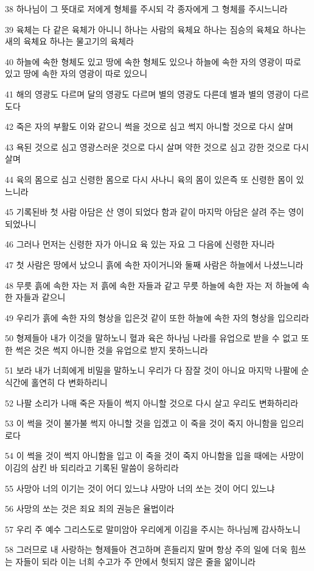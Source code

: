 \par 38 하나님이 그 뜻대로 저에게 형체를 주시되 각 종자에게 그 형체를 주시느니라
\par 39 육체는 다 같은 육체가 아니니 하나는 사람의 육체요 하나는 짐승의 육체요 하나는 새의 육체요 하나는 물고기의 육체라
\par 40 하늘에 속한 형체도 있고 땅에 속한 형체도 있으나 하늘에 속한 자의 영광이 따로 있고 땅에 속한 자의 영광이 따로 있으니
\par 41 해의 영광도 다르며 달의 영광도 다르며 별의 영광도 다른데 별과 별의 영광이 다르도다
\par 42 죽은 자의 부활도 이와 같으니 썩을 것으로 심고 썩지 아니할 것으로 다시 살며
\par 43 욕된 것으로 심고 영광스러운 것으로 다시 살며 약한 것으로 심고 강한 것으로 다시 살며
\par 44 육의 몸으로 심고 신령한 몸으로 다시 사나니 육의 몸이 있은즉 또 신령한 몸이 있느니라
\par 45 기록된바 첫 사람 아담은 산 영이 되었다 함과 같이 마지막 아담은 살려 주는 영이 되었나니
\par 46 그러나 먼저는 신령한 자가 아니요 육 있는 자요 그 다음에 신령한 자니라
\par 47 첫 사람은 땅에서 났으니 흙에 속한 자이거니와 둘째 사람은 하늘에서 나셨느니라
\par 48 무릇 흙에 속한 자는 저 흙에 속한 자들과 같고 무릇 하늘에 속한 자는 저 하늘에 속한 자들과 같으니
\par 49 우리가 흙에 속한 자의 형상을 입은것 같이 또한 하늘에 속한 자의 형상을 입으리라
\par 50 형제들아 내가 이것을 말하노니 혈과 육은 하나님 나라를 유업으로 받을 수 없고 또한 썩은 것은 썩지 아니한 것을 유업으로 받지 못하느니라
\par 51 보라 내가 너희에게 비밀을 말하노니 우리가 다 잠잘 것이 아니요 마지막 나팔에 순식간에 홀연히 다 변화하리니
\par 52 나팔 소리가 나매 죽은 자들이 썩지 아니할 것으로 다시 살고 우리도 변화하리라
\par 53 이 썩을 것이 불가불 썩지 아니할 것을 입겠고 이 죽을 것이 죽지 아니함을 입으리로다
\par 54 이 썩을 것이 썩지 아니함을 입고 이 죽을 것이 죽지 아니함을 입을 때에는 사망이 이김의 삼킨 바 되리라고 기록된 말씀이 응하리라
\par 55 사망아 너의 이기는 것이 어디 있느냐 사망아 너의 쏘는 것이 어디 있느냐
\par 56 사망의 쏘는 것은 죄요 죄의 권능은 율법이라
\par 57 우리 주 예수 그리스도로 말미암아 우리에게 이김을 주시는 하나님께 감사하노니
\par 58 그러므로 내 사랑하는 형제들아 견고하며 흔들리지 말며 항상 주의 일에 더욱 힘쓰는 자들이 되라 이는 너희 수고가 주 안에서 헛되지 않은 줄을 앎이니라


